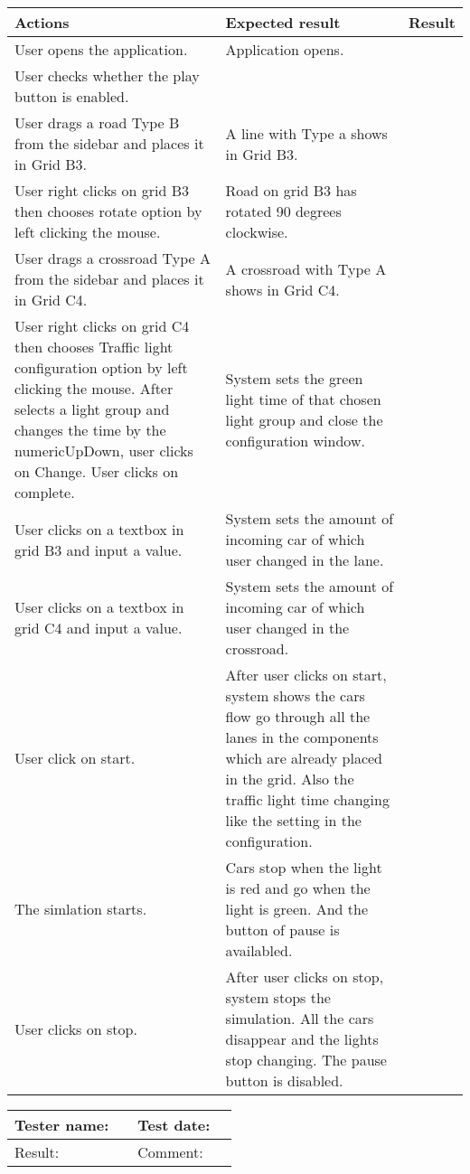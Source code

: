 	\begin{tabularx}{\textwidth}{|X|X|p{2.5cm}|}\hline
	    Actions & Expected result & Result \\\hline
	    User opens the application.& Application opens. &  \pass \\\hline
	    User checks whether the play button is enabled. & &  \pass \\\hline
	    User drags a road Type B from the sidebar and places it in Grid B3. & A line with Type a shows in Grid B3. & \pass \\\hline
	    User right clicks on grid B3 then chooses rotate option by left clicking the mouse. & Road on grid B3 has rotated 90 degrees clockwise. & \pass \\\hline
	    User drags a crossroad Type A from the sidebar and places it in Grid C4. & A crossroad with Type A shows in Grid C4. & \pass \\\hline
	    User right clicks on grid C4 then chooses Traffic light configuration  option by left clicking the mouse. After selects a light group and changes the time by the numericUpDown, user clicks on Change. User clicks on complete. & System sets the green light time of that chosen light group and close the configuration window.  & \pass \\\hline
	    User clicks on a textbox in grid B3 and input a value. & System sets the amount of incoming car of which user changed in the lane. & \pass \\\hline
	    User clicks on a textbox in grid C4 and input a value. & System sets the amount of incoming car of which user changed in the crossroad. & \pass \\\hline
	    User click on start. & After user clicks on start, system shows the cars flow go through all the lanes in the components which are already placed in the grid. Also the traffic light time changing like the setting in the configuration. & \pass \\\hline
	    The simlation starts. &	Cars stop when the light is red and go when the light is green. And the button of pause is availabled. & \pass \\\hline	
	    User clicks on stop. & After user clicks on stop, system stops the simulation. All the cars disappear and the lights stop changing. The pause button is disabled. & \pass \\\hline    
	\end{tabularx}

\begin{tabularx}{\textwidth}{|p{3cm}X|p{3cm}X|}\hline
	Tester name: &  & Test date: & \\\hline
	Result: &  \pass & Comment: & \\\hline
\end{tabularx}

